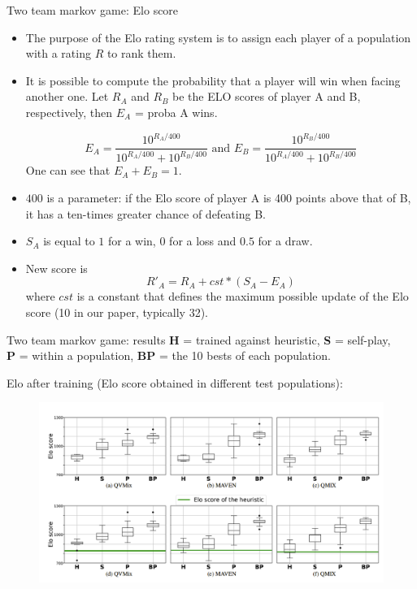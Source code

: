 \documentclass[9pt, hyperref={pdfusetitle,colorlinks=true,allcolors=DarkBlue}]{beamer}
\begin{document}
\begin{frame}{Two team markov game: Elo score }
\begin{itemize}
    \item The purpose of the Elo rating system is to assign each player of a population with a rating $R$ to rank them.
    \item It is possible to compute the probability that a player will win when facing another one.
Let $R_A$ and $R_B$ be the ELO scores of player A and B, respectively, then $E_A$ = proba A wins. 

\begin{equation}
    E_A=\frac{10^{R_A/400}}{10^{R_A/400} + 10^{R_B/400}}
    \text{ and }
    E_B=\frac{10^{R_B/400}}{10^{R_A/400} + 10^{R_B/400}}
\end{equation}
One can see that $E_A + E_B = 1$.
\item $400$ is a parameter: if the Elo score of player A is 400 points above that of B, it has a ten-times greater chance of defeating B.

\item $S_A$ is equal to $1$ for a win, $0$ for a loss and $0.5$ for a draw.

\item New score is 
\begin{equation}
    \label{eq:elo_update}
    R'_A = R_A + cst * (S_A - E_A)
\end{equation}
where $cst$ is a constant that defines the maximum possible update of the Elo score (10 in our paper, typically 32).
\end{itemize}
\end{frame}

\begin{frame}{Two team markov game: results}
\textbf{H} = trained against heuristic,
\textbf{S} = self-play,\\
\textbf{P} = within a population,
\textbf{BP} = the 10 bests of each population.

Elo after training (Elo score obtained in different test populations):
    \begin{figure}
        \centering
        \includegraphics[width=\textwidth]{2team1.png}
    \end{figure}
\end{frame}
\end{document}
